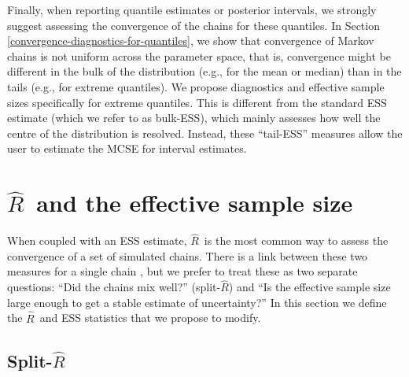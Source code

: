 \documentclass[american,]{article}
\newcommand{\Rhat}{$\widehat{R}$}
\newcommand{\sRhat}{split-$\widehat{R}$}
\theoremstyle{definition}
\begin{document}
Finally, when reporting quantile estimates or posterior intervals, we 
strongly suggest assessing the convergence of the chains for these quantiles.
In Section \ref{convergence-diagnostics-for-quantiles}, we show that
convergence of Markov chains is not uniform across the parameter space,
that is, convergence might be different in the bulk of the distribution
(e.g., for the mean or median) than in the tails (e.g., for extreme
quantiles). We propose diagnostics and effective sample sizes specifically for 
extreme quantiles. This is different from the standard ESS estimate (which 
we refer to as bulk-ESS), which mainly assesses how well
the centre of the distribution is resolved. Instead, these ``tail-ESS''
measures allow the user to estimate the MCSE for interval estimates.


\section{\Rhat\ and the effective sample size}

When coupled with an ESS estimate,  \Rhat\ is the most common way to
assess the convergence of a set of simulated chains.  There is a link between
these two measures  for a single chain \citep[see, e.g.][]{vats2018revisiting}, but we prefer to 
treat these as two separate questions: ``Did the chains mix well?'' (\sRhat) and 
``Is the effective sample size large enough to get a stable estimate of uncertainty?''
In this section we define the \Rhat\ and ESS statistics that we propose to modify.

% 
%

\hypertarget{SplitRhat}{%
\subsection{Split-\Rhat}\label{SplitRhat}}
\end{document}
